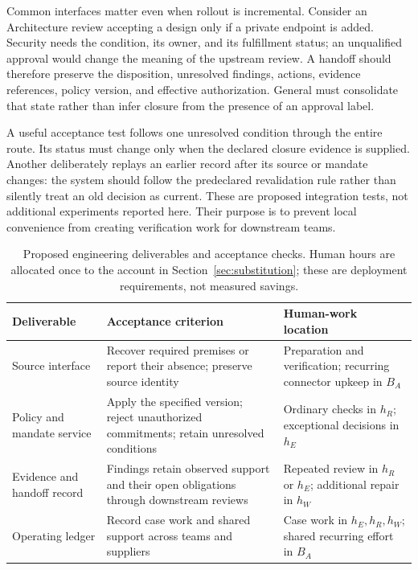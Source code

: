 Common interfaces matter even when rollout is incremental. Consider an Architecture review
accepting a design only if a private endpoint is added. Security needs the condition, its
owner, and its fulfillment status; an unqualified approval would change the meaning of the
upstream review. A handoff should therefore preserve the disposition, unresolved findings,
actions, evidence references, policy version, and effective authorization. General must
consolidate that state rather than infer closure from the presence of an approval label.

A useful acceptance test follows one unresolved condition through the entire route. Its
status must change only when the declared closure evidence is supplied. Another deliberately
replays an earlier record after its source or mandate changes: the system should follow the
predeclared revalidation rule rather than silently treat an old decision as current. These
are proposed integration tests, not additional experiments reported here. Their purpose is
to prevent local convenience from creating verification work for downstream teams.

\begin{table}[!htb]
\centering\small
\caption{Proposed engineering deliverables and acceptance checks. Human hours are allocated
once to the account in Section~\ref{sec:substitution}; these are deployment requirements,
not measured savings.}
\label{tab:fde-deliverables}
\begin{tabularx}{\linewidth}{@{}P{2.65cm}LP{3.4cm}@{}}
\toprule
Deliverable & Acceptance criterion & Human-work location\\
\midrule
Source interface & Recover required premises or report their absence; preserve source identity
& Preparation and verification; recurring connector upkeep in $B_A$\\
Policy and mandate service & Apply the specified version; reject unauthorized commitments;
retain unresolved conditions & Ordinary checks in $h_R$; exceptional decisions in $h_E$\\
Evidence and handoff record & Findings retain observed support and their open obligations
through downstream reviews & Repeated review in $h_R$ or $h_E$; additional repair in $h_W$\\
Operating ledger & Record case work and shared support across teams and suppliers
& Case work in $h_E,h_R,h_W$; shared recurring effort in $B_A$\\
\bottomrule
\end{tabularx}
\end{table}

